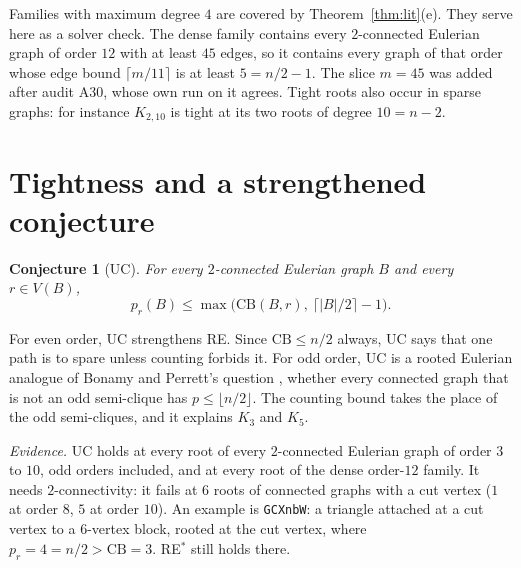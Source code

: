 \documentclass[11pt]{amsart}
\newtheorem{conjecture}[theorem]{Conjecture}
\theoremstyle{definition}
\newcommand{\pr}{p_r}
\newcommand{\CB}{\mathrm{CB}}
\begin{document}
Families with maximum degree $4$ are covered by Theorem~\ref{thm:lit}(e). They serve here as a solver
check. The dense family contains every $2$-connected Eulerian graph of order $12$ with at least $45$
edges, so it contains every graph of that order whose edge bound $\lceil m/11\rceil$ is at least
$5=n/2-1$. The slice $m=45$ was added after audit A30, whose own run on it agrees. Tight roots also occur in sparse graphs: for instance $K_{2,10}$ is tight at its two roots of
degree $10=n-2$.

\section{Tightness and a strengthened conjecture}\label{sec:uc}

\begin{conjecture}[UC]\label{conj:uc}
For every $2$-connected Eulerian graph $B$ and every $r\in V(B)$,
\[
\pr(B)\le\max\bigl(\CB(B,r),\ \lceil |B|/2\rceil-1\bigr).
\]
\end{conjecture}

For even order, UC strengthens RE. Since $\CB\le n/2$ always, UC says that one path is to spare
unless counting forbids it. For odd order, UC is a rooted Eulerian analogue of Bonamy and
Perrett's question \cite[Question~1.1]{BP}, whether every connected graph that is not an odd
semi-clique has $p\le\lfloor n/2\rfloor$. The counting bound takes the place of the odd
semi-cliques, and it explains $K_3$ and $K_5$.

\emph{Evidence.} UC holds at every root of every $2$-connected Eulerian graph of order $3$ to $10$,
odd orders included, and at every root of the dense order-$12$ family. It needs $2$-connectivity: it
fails at $6$ roots of connected graphs with a cut vertex ($1$ at order $8$, $5$ at order $10$). An
example is \texttt{GCXnbW}: a triangle attached at a cut vertex to a $6$-vertex block, rooted at the
cut vertex, where $\pr=4=n/2>\CB=3$. RE$^*$ still holds there.
\end{document}
